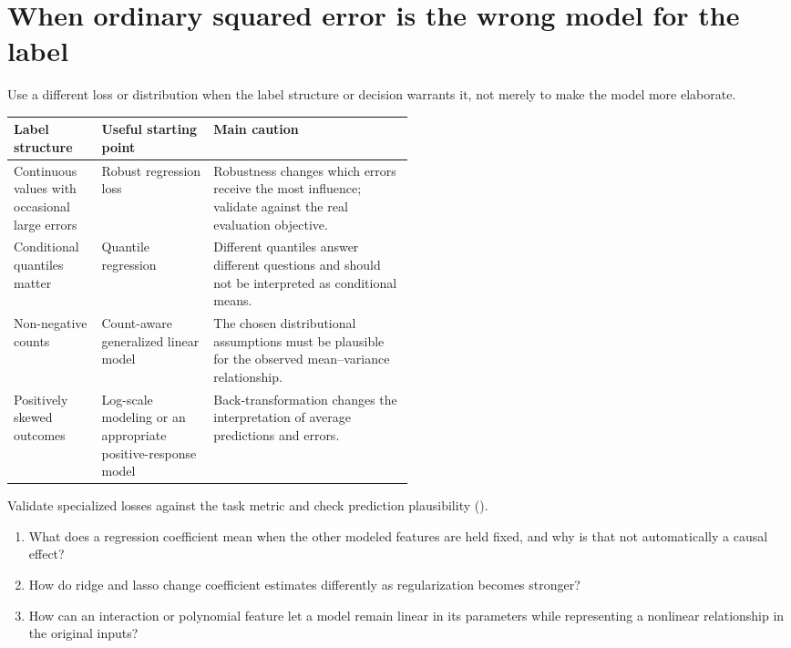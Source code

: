 \section{When ordinary squared error is the wrong model for the label}
\label{sec:special-regression-labels}

Use a different loss or distribution when the label structure or decision warrants it, not merely to make the model more elaborate.

\begin{mltable}
\begin{tabularx}{\linewidth}{@{}p{0.22\linewidth}p{0.29\linewidth}X@{}}
\toprule
\rowcolor{MLPaleBlue!92}
Label structure & Useful starting point & Main caution \\
\midrule
Continuous values with occasional large errors & Robust regression loss & Robustness changes which errors receive the most influence; validate against the real evaluation objective. \\
Conditional quantiles matter & Quantile regression & Different quantiles answer different questions and should not be interpreted as conditional means. \\
Non-negative counts & Count-aware generalized linear model & The chosen distributional assumptions must be plausible for the observed mean--variance relationship. \\
Positively skewed outcomes & Log-scale modeling or an appropriate positive-response model & Back-transformation changes the interpretation of average predictions and errors. \\
\bottomrule
\end{tabularx}
\end{mltable}

Validate specialized losses against the task metric and check prediction plausibility ().

\begin{quickcheck}
\begin{enumerate}
  \item What does a regression coefficient mean when the other modeled features are held fixed, and why is that not automatically a causal effect?
  \item How do ridge and lasso change coefficient estimates differently as regularization becomes stronger?
  \item How can an interaction or polynomial feature let a model remain linear in its parameters while representing a nonlinear relationship in the original inputs?
\end{enumerate}
\end{quickcheck}
